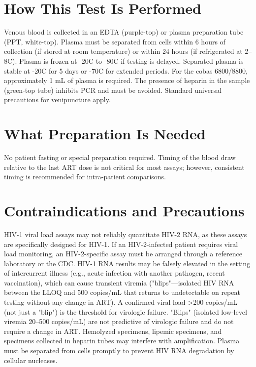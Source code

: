 \section*{How This Test Is Performed}
Venous blood is collected in an EDTA (purple-top) or plasma preparation tube (PPT, white-top). Plasma must be separated from cells within 6 hours of collection (if stored at room temperature) or within 24 hours (if refrigerated at 2--8\textdegree{}C). Plasma is frozen at -20\textdegree{}C to -80\textdegree{}C if testing is delayed. Separated plasma is stable at -20\textdegree{}C for 5 days or -70\textdegree{}C for extended periods. For the cobas 6800/8800, approximately 1 mL of plasma is required. The presence of heparin in the sample (green-top tube) inhibits PCR and must be avoided. Standard universal precautions for venipuncture apply.

\section*{What Preparation Is Needed}
No patient fasting or special preparation required. Timing of the blood draw relative to the last ART dose is not critical for most assays; however, consistent timing is recommended for intra-patient comparisons.

\section*{Contraindications and Precautions}
HIV-1 viral load assays may not reliably quantitate HIV-2 RNA, as these assays are specifically designed for HIV-1. If an HIV-2-infected patient requires viral load monitoring, an HIV-2-specific assay must be arranged through a reference laboratory or the CDC. HIV-1 RNA results may be falsely elevated in the setting of intercurrent illness (e.g., acute infection with another pathogen, recent vaccination), which can cause transient viremia ("blips"---isolated HIV RNA between the LLOQ and 500 copies/mL that returns to undetectable on repeat testing without any change in ART). A confirmed viral load >200 copies/mL (not just a "blip") is the threshold for virologic failure. "Blips" (isolated low-level viremia 20--500 copies/mL) are not predictive of virologic failure and do not require a change in ART. Hemolyzed specimens, lipemic specimens, and specimens collected in heparin tubes may interfere with amplification. Plasma must be separated from cells promptly to prevent HIV RNA degradation by cellular nucleases.

